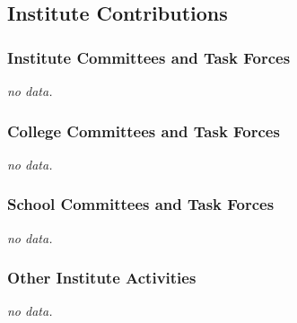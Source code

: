     \subsection{Institute Contributions}
    \label{subsec:mylabel1}
        \subsubsection{Institute Committees and Task Forces}
        \begin{numerate}
            \item[] \textsl{no data.}
        \end{numerate}

        \subsubsection{College Committees and Task Forces}
            \begin{subnum}
            \item[] \textsl{no data.}
            \end{subnum}

        \subsubsection{School Committees and Task Forces}
            \begin{subnum}
            \item[] \textsl{no data.}
            \end{subnum}

        \subsubsection{Other Institute Activities}
        \label{sec:other}
            \begin{subnum}
            \item[] \textsl{no data.}
            \end{subnum}


